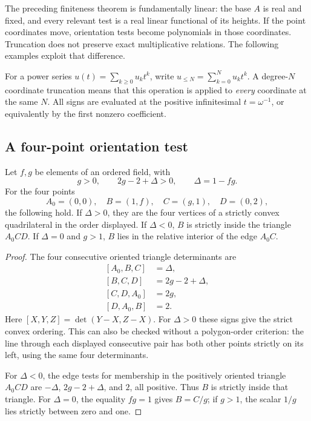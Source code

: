 \documentclass[11pt,a4paper]{article}
\numberwithin{equation}{section}
\theoremstyle{plain}
\begin{document}
The preceding finiteness theorem is fundamentally linear: the base $A$ is
real and fixed, and every relevant test is a real linear functional of
its heights. If the point coordinates move, orientation tests become
polynomials in those coordinates. Truncation does not preserve exact
multiplicative relations. The following examples exploit that difference.

For a power series $u(t)=\sum_{k\ge0}u_k t^k$, write
$u_{\le N}=\sum_{k=0}^N u_k t^k$. A degree-$N$ coordinate truncation means
that this operation is applied to \emph{every} coordinate at the same $N$.
All signs are evaluated at the positive infinitesimal $t=\omega^{-1}$,
or equivalently by the first nonzero coefficient.

\subsection{A four-point orientation test}
\begin{lemma}\label{poly:ts:lem:fourpoints}
Let $f,g$ be elements of an ordered field, with
\[
 g>0,\qquad 2g-2+\Delta>0,\qquad \Delta=1-fg.
\]
For the four points
\begin{equation}\label{poly:ts:eq:fourpoints}
 A_0=(0,0),\quad B=(1,f),\quad C=(g,1),\quad D=(0,2),
\end{equation}
the following hold. If $\Delta>0$, they are the four vertices of a
strictly convex quadrilateral in the order displayed. If $\Delta<0$,
$B$ is strictly inside the triangle $A_0CD$. If $\Delta=0$ and $g>1$,
$B$ lies in the relative interior of the edge $A_0C$.
\end{lemma}
\begin{proof}
The four consecutive oriented triangle determinants are
\begin{equation}\label{poly:ts:eq:four-dets}
 \begin{split}
 [A_0,B,C]&=\Delta,\\
 [B,C,D]&=2g-2+\Delta,\\
 [C,D,A_0]&=2g,\\
 [D,A_0,B]&=2.
 \end{split}
\end{equation}
Here $[X,Y,Z]=\det(Y-X,Z-X)$. For $\Delta>0$ these signs give the
strict convex ordering. This can also be checked without a polygon-order
criterion: the line through each displayed consecutive pair has both other
points strictly on its left, using the same four determinants.

For $\Delta<0$, the edge tests for membership in the positively oriented
triangle $A_0CD$ are $-\Delta$, $2g-2+\Delta$, and $2$, all positive.
Thus $B$ is strictly inside that triangle. For $\Delta=0$, the equality
$fg=1$ gives $B=C/g$; if $g>1$, the scalar $1/g$ lies strictly between
zero and one.
\end{proof}
\end{document}
